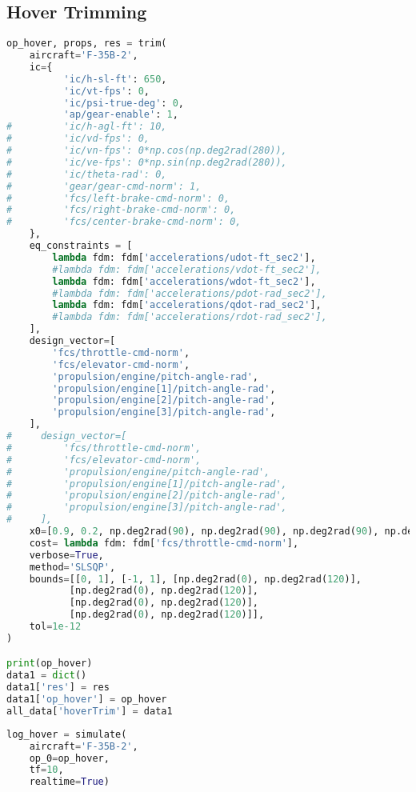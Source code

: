 \hypertarget{hover-trimming}{%
\subsection{Hover Trimming}\label{hover-trimming}}

\begin{lstlisting}[language=Python]
op_hover, props, res = trim(
    aircraft='F-35B-2',
    ic={  
          'ic/h-sl-ft': 650,
          'ic/vt-fps': 0,
          'ic/psi-true-deg': 0,
          'ap/gear-enable': 1,
#         'ic/h-agl-ft': 10,
#         'ic/vd-fps': 0,
#         'ic/vn-fps': 0*np.cos(np.deg2rad(280)),
#         'ic/ve-fps': 0*np.sin(np.deg2rad(280)),
#         'ic/theta-rad': 0,
#         'gear/gear-cmd-norm': 1,
#         'fcs/left-brake-cmd-norm': 0,
#         'fcs/right-brake-cmd-norm': 0,
#         'fcs/center-brake-cmd-norm': 0,
    },
    eq_constraints = [
        lambda fdm: fdm['accelerations/udot-ft_sec2'],
        #lambda fdm: fdm['accelerations/vdot-ft_sec2'],
        lambda fdm: fdm['accelerations/wdot-ft_sec2'],
        #lambda fdm: fdm['accelerations/pdot-rad_sec2'],
        lambda fdm: fdm['accelerations/qdot-rad_sec2'],
        #lambda fdm: fdm['accelerations/rdot-rad_sec2'],
    ],
    design_vector=[
        'fcs/throttle-cmd-norm',
        'fcs/elevator-cmd-norm',
        'propulsion/engine/pitch-angle-rad',
        'propulsion/engine[1]/pitch-angle-rad',
        'propulsion/engine[2]/pitch-angle-rad',
        'propulsion/engine[3]/pitch-angle-rad',
    ],
#     design_vector=[
#         'fcs/throttle-cmd-norm',
#         'fcs/elevator-cmd-norm',
#         'propulsion/engine/pitch-angle-rad',
#         'propulsion/engine[1]/pitch-angle-rad',
#         'propulsion/engine[2]/pitch-angle-rad',
#         'propulsion/engine[3]/pitch-angle-rad',
#     ],
    x0=[0.9, 0.2, np.deg2rad(90), np.deg2rad(90), np.deg2rad(90), np.deg2rad(90)],
    cost= lambda fdm: fdm['fcs/throttle-cmd-norm'],
    verbose=True,
    method='SLSQP',
    bounds=[[0, 1], [-1, 1], [np.deg2rad(0), np.deg2rad(120)], 
           [np.deg2rad(0), np.deg2rad(120)],
           [np.deg2rad(0), np.deg2rad(120)],
           [np.deg2rad(0), np.deg2rad(120)]],
    tol=1e-12
)

print(op_hover)
data1 = dict()
data1['res'] = res
data1['op_hover'] = op_hover
all_data['hoverTrim'] = data1
\end{lstlisting}

\begin{lstlisting}[language=Python]
log_hover = simulate(
    aircraft='F-35B-2',
    op_0=op_hover,
    tf=10,
    realtime=True)
\end{lstlisting}

